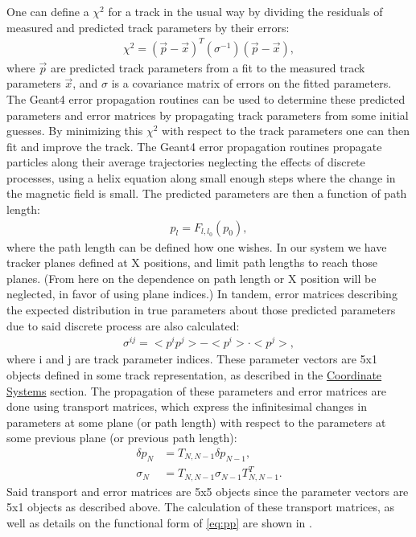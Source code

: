     One can define a $\chi^{2}$ for a track in the usual way by dividing the residuals of measured and predicted track parameters by their errors:
        \begin{align} \label{eq:chi2}
            \chi^2 = (\vec{p}-\vec{x})^{T} (\sigma^{-1}) (\vec{p}-\vec{x}),
        \end{align}
    where $\vec{p}$ are predicted track parameters from a fit to the measured track parameters $\vec{x}$, and $\sigma$ is a covariance matrix of errors on the fitted parameters. The Geant4 error propagation routines can be used to determine these predicted parameters and error matrices by propagating track parameters from some initial guesses. By minimizing this $\chi^{2}$ with respect to the track parameters one can then fit and improve the track. The Geant4 error propagation routines propagate particles along their average trajectories neglecting the effects of discrete processes, using a helix equation along small enough steps where the change in the magnetic field is small. The predicted parameters are then a function of path length: 
        \begin{align} \label{eq:pp}
            p_{l} = F_{l,l_{0}}(p_{0}),
        \end{align}
    where the path length can be defined how one wishes. In our system we have tracker planes defined at X positions, and limit path lengths to reach those planes. (From here on the dependence on path length or X position will be neglected, in favor of using plane indices.) In tandem, error matrices describing the expected distribution in true parameters about those predicted parameters due to said discrete process are also calculated:
        \begin{align} \label{eq:sigma}
            \sigma^{ij} = <p^{i}p^{j}> - <p^{i}> \cdot <p^{j}>,
        \end{align} 
    where i and j are track parameter indices. These parameter vectors are 5x1 objects defined in some track representation, as described in the \hyperref[sec:Coord]{Coordinate Systems} section. The propagation of these parameters and error matrices are done using transport matrices, which express the infinitesimal changes in parameters at some plane (or path length) with respect to the parameters at some previous plane (or previous path length):
        \begin{align} \label{eq:transport}
            \delta p_{N} &= T_{N,N-1} \delta p_{N-1}, \\
            \sigma_{N} &= T_{N,N-1} \sigma_{N-1} T_{N,N-1}^{T}.
        \end{align}
    Said transport and error matrices are 5x5 objects since the parameter vectors are 5x1 objects as described above. The calculation of these transport matrices, as well as details on the functional form of \ref{eq:pp} are shown in \cite{jacob}.


